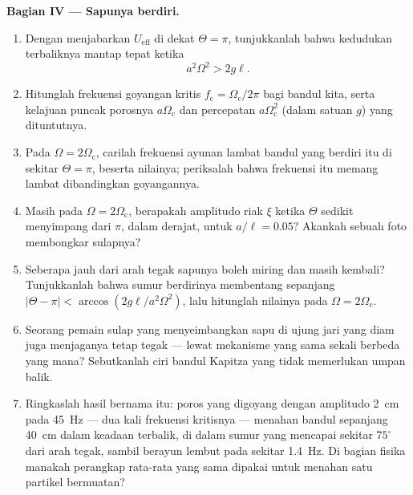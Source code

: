 \begin{problem}
\medskip\noindent\textbf{Bagian IV --- Sapunya berdiri.}
\begin{enumerate}[resume]
  \item Dengan menjabarkan $U_{\text{eff}}$ di dekat $\Theta = \pi$,
        tunjukkanlah bahwa kedudukan terbaliknya mantap tepat ketika
        \[
        a^2\Omega^2 > 2g\ell .
        \]
  \item Hitunglah frekuensi goyangan kritis $f_{\text{c}} =
        \Omega_{\text{c}}/2\pi$ bagi bandul kita, serta kelajuan puncak
        porosnya $a\Omega_{\text{c}}$ dan percepatan
        $a\Omega_{\text{c}}^2$ (dalam satuan $g$) yang dituntutnya.
  \item Pada $\Omega = 2\Omega_{\text{c}}$, carilah frekuensi ayunan
        lambat bandul yang berdiri itu di sekitar $\Theta = \pi$,
        beserta nilainya; periksalah bahwa frekuensi itu memang lambat
        dibandingkan goyangannya.
  \item Masih pada $\Omega = 2\Omega_{\text{c}}$, berapakah amplitudo
        riak $\xi$ ketika $\Theta$ sedikit menyimpang dari $\pi$, dalam
        derajat, untuk $a/\ell = 0.05$? Akankah sebuah foto membongkar
        sulapnya?
  \item Seberapa jauh dari arah tegak sapunya boleh miring dan masih
        kembali? Tunjukkanlah bahwa sumur berdirinya membentang sepanjang $|\Theta - \pi| <
        \arccos(2g\ell/a^2\Omega^2)$, lalu hitunglah nilainya pada $\Omega =
        2\Omega_{\text{c}}$.
  \item Seorang pemain sulap yang menyeimbangkan sapu di ujung jari yang
        diam juga menjaganya tetap tegak --- lewat mekanisme yang sama
        sekali berbeda yang mana? Sebutkanlah ciri bandul Kapitza yang
        tidak memerlukan umpan balik.
  \item Ringkaslah hasil bernama itu: poros yang digoyang dengan
        amplitudo \qty{2}{cm} pada \qty{45}{Hz} --- dua kali frekuensi
        kritisnya --- menahan bandul sepanjang \qty{40}{cm} dalam
        keadaan terbalik, di dalam sumur yang mencapai sekitar
        $75^\circ$ dari arah tegak, sambil berayun lembut pada sekitar
        \qty{1.4}{Hz}. Di bagian fisika manakah perangkap rata-rata yang
        sama dipakai untuk menahan satu partikel bermuatan?
\end{enumerate}
\end{problem}
